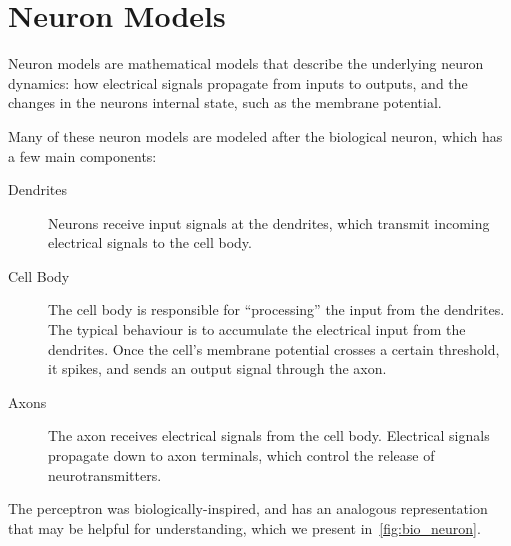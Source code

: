 \documentclass[fyp]{socreport}
\begin{document}
\section{Neuron Models\label{sec:spiking-neuron-model}}

Neuron models are mathematical models that describe the underlying neuron
dynamics: how electrical signals propagate from inputs to outputs, and the
changes in the neurons internal state, such as the membrane potential.

Many of these neuron models are modeled after the biological neuron, which has a
few main components:

\begin{description}
  \item[{Dendrites}] Neurons receive input signals at the dendrites, which
    transmit incoming electrical signals to the cell body.
  \item[{Cell Body}] The cell body is responsible for ``processing'' the input
    from the dendrites. The typical behaviour is to accumulate the electrical
    input from the dendrites. Once the cell's membrane potential crosses a
    certain threshold, it spikes, and sends an output signal through the axon.
  \item[{Axons}] The axon receives electrical signals from the cell body.
    Electrical signals propagate down to axon terminals, which control the
    release of neurotransmitters.
\end{description}

The perceptron was biologically-inspired, and has an analogous representation
that may be helpful for understanding, which we present
in~\autoref{fig:bio_neuron}.
\end{document}
